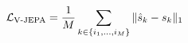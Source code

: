 \documentclass[preview]{standalone}
\begin{document}
\begin{align*}
\special{dvisvgm:raw <g id='unique000'>}\mathcal{L}_{\text{V-JEPA}} = \frac{1}{M} \sum_{k \in \{i_1, \dots, i_M\}} \|\hat{s}_k - s_k\|_1\special{dvisvgm:raw </g>}
\end{align*}
\end{document}
